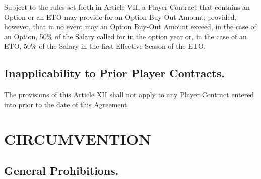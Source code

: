 \documentclass[
]{book}
\begin{document}
Subject to the rules set forth in Article VII, a Player Contract that contains an Option or an ETO may provide for an Option Buy-Out Amount; provided, however, that in no event may an Option Buy-Out Amount exceed, in the case of an Option, 50\% of the Salary called for in the option year or, in the case of an ETO, 50\% of the Salary in the first Effective Season of the ETO.

\hypertarget{inapplicability-to-prior-player-contracts.}{%
\section{Inapplicability to Prior Player Contracts.}\label{inapplicability-to-prior-player-contracts.}}

The provisions of this Article XII shall not apply to any Player Contract entered into prior to the date of this Agreement.

\hypertarget{circumvention}{%
\chapter{CIRCUMVENTION}\label{circumvention}}

\hypertarget{general-prohibitions.}{%
\section{General Prohibitions.}\label{general-prohibitions.}}
\end{document}
